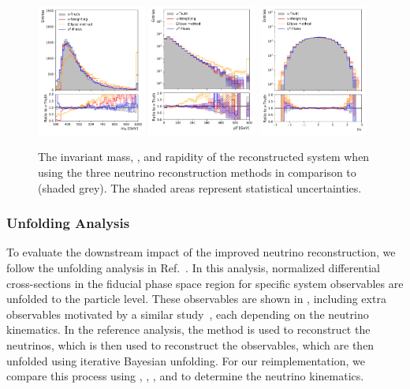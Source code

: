 \begin{figure}[tbp]
    \centering
    \includegraphics[width=0.32\textwidth]{Figures/neutrino_unfolding/ttbar_reco/ttbar_m.pdf}
    \includegraphics[width=0.32\textwidth]{Figures/neutrino_unfolding/ttbar_reco/ttbar_pt.pdf}
    \includegraphics[width=0.32\textwidth]{Figures/neutrino_unfolding/ttbar_reco/ttbar_rapidity.pdf}
    \caption{The invariant mass, \pt, and rapidity of the reconstructed \ttbar system when using the three neutrino reconstruction methods in comparison to \vtruth (shaded grey). The shaded areas represent statistical uncertainties.}
    \label{fig:ttbar_kin}
\end{figure}

\subsubsection{Unfolding Analysis}

To evaluate the downstream impact of the improved neutrino reconstruction, we follow the unfolding analysis in Ref.~\cite{ATLAS:2016pbv}.
In this analysis, normalized differential cross-sections in the fiducial phase space region for specific \ttbar system observables are unfolded to the particle level.
These observables are shown in , including extra observables motivated by a similar study~\cite{CMS:2017iqf}, each depending on the neutrino kinematics.
In the reference analysis, the \vweight method is used to reconstruct the neutrinos, which is then used to reconstruct the observables, which are then unfolded using iterative Bayesian unfolding.
For our reimplementation, we compare this process using \vvflows, \vweight, \ellipse, and \vtruth to determine the neutrino kinematics.


